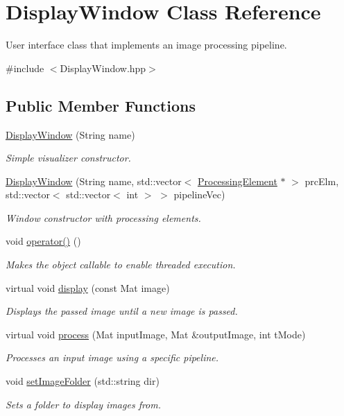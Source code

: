 \hypertarget{classDisplayWindow}{\section{\-Display\-Window \-Class \-Reference}
\label{classDisplayWindow}
}


\-User interface class that implements an image processing pipeline.  




{\ttfamily \#include $<$\-Display\-Window.\-hpp$>$}

\subsection*{\-Public \-Member \-Functions}
\begin{DoxyCompactItemize}
\item 
\hyperlink{classDisplayWindow_afcdf3fd9c7531850bea42250321572f0}{\-Display\-Window} (\-String name)
\begin{DoxyCompactList}\small\item\em \-Simple visualizer constructor. \end{DoxyCompactList}\item 
\hyperlink{classDisplayWindow_a58626b41bbb9cb8ce0cfed3308f21e9d}{\-Display\-Window} (\-String name, std\-::vector$<$ \hyperlink{classProcessingElement}{\-Processing\-Element} $\ast$ $>$ prc\-Elm, std\-::vector$<$ std\-::vector$<$ int $>$ $>$ pipeline\-Vec)
\begin{DoxyCompactList}\small\item\em \-Window constructor with processing elements. \end{DoxyCompactList}\item 
void \hyperlink{classDisplayWindow_a3a96fe9c067e9564872fb9d4e1b0ee3a}{operator()} ()
\begin{DoxyCompactList}\small\item\em \-Makes the object callable to enable threaded execution. \end{DoxyCompactList}\item 
virtual void \hyperlink{classDisplayWindow_a6585a9a0b92f30e407db1a8b7481de1c}{display} (const \-Mat image)
\begin{DoxyCompactList}\small\item\em \-Displays the passed image until a new image is passed. \end{DoxyCompactList}\item 
virtual void \hyperlink{classDisplayWindow_a518f0c8495cd4b0b294024399cf1cd30}{process} (\-Mat input\-Image, \-Mat \&output\-Image, int t\-Mode)
\begin{DoxyCompactList}\small\item\em \-Processes an input image using a specific pipeline. \end{DoxyCompactList}\item 
void \hyperlink{classDisplayWindow_ae3e644f98bfd3581c9668adfbf044497}{set\-Image\-Folder} (std\-::string dir)
\begin{DoxyCompactList}\small\item\em \-Sets a folder to display images from. \end{DoxyCompactList}\end{DoxyCompactItemize}
